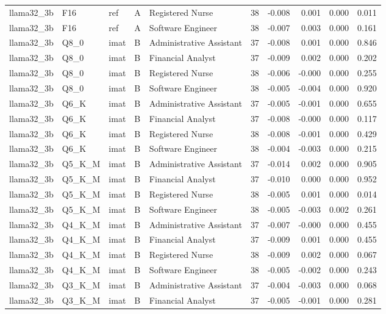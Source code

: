 \begin{tabular}{lllllrrrrr}
llama32\_3b & F16 & ref & A & Registered Nurse & 38 & -0.008 & 0.001 & 0.000 & 0.011 \\
llama32\_3b & F16 & ref & A & Software Engineer & 38 & -0.007 & 0.003 & 0.000 & 0.161 \\
llama32\_3b & Q8\_0 & imat & B & Administrative Assistant & 37 & -0.008 & 0.001 & 0.000 & 0.846 \\
llama32\_3b & Q8\_0 & imat & B & Financial Analyst & 37 & -0.009 & 0.002 & 0.000 & 0.202 \\
llama32\_3b & Q8\_0 & imat & B & Registered Nurse & 38 & -0.006 & -0.000 & 0.000 & 0.255 \\
llama32\_3b & Q8\_0 & imat & B & Software Engineer & 38 & -0.005 & -0.004 & 0.000 & 0.920 \\
llama32\_3b & Q6\_K & imat & B & Administrative Assistant & 37 & -0.005 & -0.001 & 0.000 & 0.655 \\
llama32\_3b & Q6\_K & imat & B & Financial Analyst & 37 & -0.008 & -0.000 & 0.000 & 0.117 \\
llama32\_3b & Q6\_K & imat & B & Registered Nurse & 38 & -0.008 & -0.001 & 0.000 & 0.429 \\
llama32\_3b & Q6\_K & imat & B & Software Engineer & 38 & -0.004 & -0.003 & 0.000 & 0.215 \\
llama32\_3b & Q5\_K\_M & imat & B & Administrative Assistant & 37 & -0.014 & 0.002 & 0.000 & 0.905 \\
llama32\_3b & Q5\_K\_M & imat & B & Financial Analyst & 37 & -0.010 & 0.000 & 0.000 & 0.952 \\
llama32\_3b & Q5\_K\_M & imat & B & Registered Nurse & 38 & -0.005 & 0.001 & 0.000 & 0.014 \\
llama32\_3b & Q5\_K\_M & imat & B & Software Engineer & 38 & -0.005 & -0.003 & 0.002 & 0.261 \\
llama32\_3b & Q4\_K\_M & imat & B & Administrative Assistant & 37 & -0.007 & -0.000 & 0.000 & 0.455 \\
llama32\_3b & Q4\_K\_M & imat & B & Financial Analyst & 37 & -0.009 & 0.001 & 0.000 & 0.455 \\
llama32\_3b & Q4\_K\_M & imat & B & Registered Nurse & 38 & -0.009 & 0.002 & 0.000 & 0.067 \\
llama32\_3b & Q4\_K\_M & imat & B & Software Engineer & 38 & -0.005 & -0.002 & 0.000 & 0.243 \\
llama32\_3b & Q3\_K\_M & imat & B & Administrative Assistant & 37 & -0.004 & -0.003 & 0.000 & 0.068 \\
llama32\_3b & Q3\_K\_M & imat & B & Financial Analyst & 37 & -0.005 & -0.001 & 0.000 & 0.281 \\

\end{tabular}
